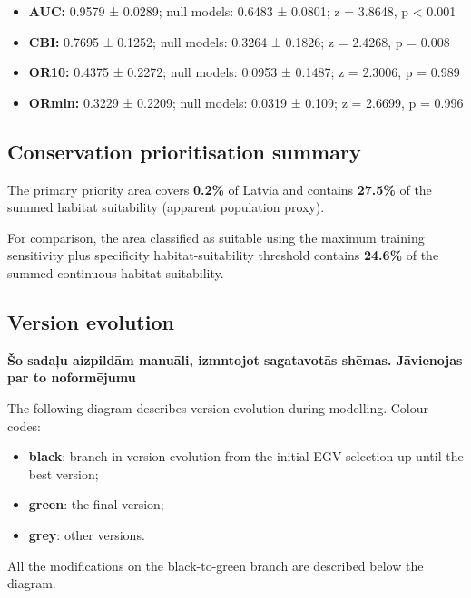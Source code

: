 \documentclass[
  openany]{book}
\providecommand{\tightlist}{%
  \setlength{\itemsep}{0pt}\setlength{\parskip}{0pt}}
\providecommand{\tightlist}{%
  \setlength{\itemsep}{0pt}%
  \setlength{\parskip}{0pt}%
}
\begin{document}
\begin{itemize}
\tightlist
\item
  \textbf{AUC:} 0.9579 ± 0.0289; null models: 0.6483 ± 0.0801; z = 3.8648, p \textless{} 0.001
\item
  \textbf{CBI:} 0.7695 ± 0.1252; null models: 0.3264 ± 0.1826; z = 2.4268, p = 0.008
\item
  \textbf{OR10:} 0.4375 ± 0.2272; null models: 0.0953 ± 0.1487; z = 2.3006, p = 0.989
\item
  \textbf{ORmin:} 0.3229 ± 0.2209; null models: 0.0319 ± 0.109; z = 2.6699, p = 0.996
\end{itemize}

\subsection*{Conservation prioritisation summary}\label{conservation-prioritisation-summary-25}

The primary priority area covers \textbf{0.2\%} of Latvia and contains \textbf{27.5\%} of the summed habitat suitability (apparent population proxy).

For comparison, the area classified as suitable using the maximum training sensitivity plus specificity habitat-suitability threshold contains \textbf{24.6\%} of the summed continuous habitat suitability.

\subsection*{Version evolution}\label{version-evolution-25}

\textbf{Šo sadaļu aizpildām manuāli, izmntojot sagatavotās shēmas. Jāvienojas par to noformējumu}

The following diagram describes version evolution during modelling.
Colour codes:

\begin{itemize}
\item
  \textbf{black}: branch in version evolution from the initial EGV selection up
  until the best version;
\item
  \textbf{green}: the final version;
\item
  \textbf{grey}: other versions.
\end{itemize}

All the modifications on the black-to-green branch are described below the
diagram.
\end{document}

